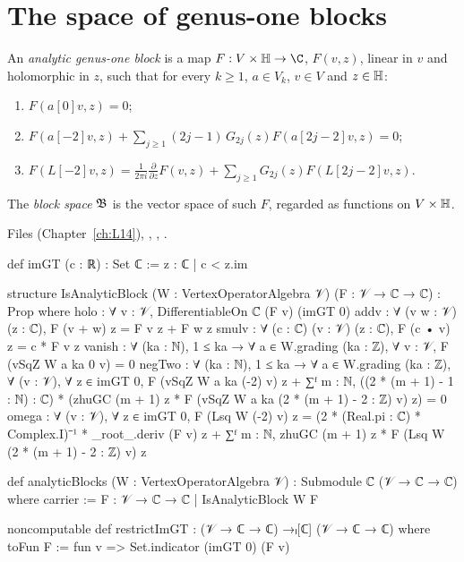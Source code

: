 \section{The space of genus-one blocks}\label{l15:sec:blocks}

\begin{definition}\label{l15:def:analyticblock}
An \emph{analytic genus-one block} is a map $F:V\times\lfifteenH\to\C$, $F(v,z)$, linear in $v$ and holomorphic in $z$,
such that for every $k\ge1$, $a\in V_k$, $v\in V$ and $z\in\mathbb{H}$:
\begin{enumerate}
\item[(i)] $F(a[0]v,z)=0$;
\item[(ii)] $F(a[-2]v,z)+\sum_{j\ge1}(2j-1)\,G_{2j}(z)F(a[2j-2]v,z)=0$;
\item[(iii)] $F(L[-2]v,z)=\frac1{2\pi i}\frac{\partial}{\partial z}F(v,z)+\sum_{j\ge1}G_{2j}(z)F(L[2j-2]v,z)$.
\end{enumerate}
The \emph{block space} $\mathfrak{B}$ is the vector space of such $F$, regarded as functions on $V\times\mathbb{H}$.
\end{definition}
\noindent Files  (Chapter~\ref{ch:L14}),
, ,
.
\begin{leancode}
def imGT (c : ℝ) : Set ℂ := {z : ℂ | c < z.im}

structure IsAnalyticBlock (W : VertexOperatorAlgebra 𝒱) (F : 𝒱 → ℂ → ℂ) : Prop where
  holo : ∀ v : 𝒱, DifferentiableOn ℂ (F v) (imGT 0)
  addv : ∀ (v w : 𝒱) (z : ℂ), F (v + w) z = F v z + F w z
  smulv : ∀ (c : ℂ) (v : 𝒱) (z : ℂ), F (c • v) z = c * F v z
  vanish : ∀ (ka : ℕ), 1 ≤ ka → ∀ a ∈ W.grading (ka : ℤ), ∀ v : 𝒱, F (vSqZ W a ka 0 v) = 0
  negTwo : ∀ (ka : ℕ), 1 ≤ ka → ∀ a ∈ W.grading (ka : ℤ), ∀ (v : 𝒱), ∀ z ∈ imGT 0,
    F (vSqZ W a ka (-2) v) z
      + ∑ᶠ m : ℕ, ((2 * (m + 1) - 1 : ℕ) : ℂ)
          * (zhuGC (m + 1) z * F (vSqZ W a ka (2 * (m + 1) - 2 : ℤ) v) z) = 0
  omega : ∀ (v : 𝒱), ∀ z ∈ imGT 0,
    F (Lsq W (-2) v) z
      = (2 * (Real.pi : ℂ) * Complex.I)⁻¹ * _root_.deriv (F v) z
        + ∑ᶠ m : ℕ, zhuGC (m + 1) z * F (Lsq W (2 * (m + 1) - 2 : ℤ) v) z

def analyticBlocks (W : VertexOperatorAlgebra 𝒱) : Submodule ℂ (𝒱 → ℂ → ℂ) where
  carrier := {F : 𝒱 → ℂ → ℂ | IsAnalyticBlock W F}

noncomputable def restrictImGT : (𝒱 → ℂ → ℂ) →ₗ[ℂ] (𝒱 → ℂ → ℂ) where
  toFun F := fun v => Set.indicator (imGT 0) (F v)
\end{leancode}

